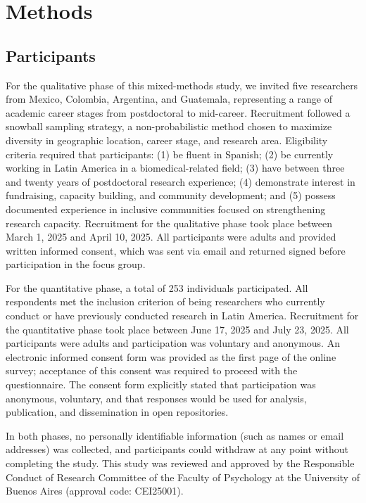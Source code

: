 \documentclass[
  letterpaper,
  DIV=11,
  numbers=noendperiod]{scrartcl}
\begin{document}
\section{Methods}\label{methods}

\subsection{Participants}\label{participants}

For the qualitative phase of this mixed-methods study, we invited five
researchers from Mexico, Colombia, Argentina, and Guatemala,
representing a range of academic career stages from postdoctoral to
mid-career. Recruitment followed a snowball sampling strategy, a
non-probabilistic method chosen to maximize diversity in geographic
location, career stage, and research area. Eligibility criteria required
that participants: (1) be fluent in Spanish; (2) be currently working in
Latin America in a biomedical-related field; (3) have between three and
twenty years of postdoctoral research experience; (4) demonstrate
interest in fundraising, capacity building, and community development;
and (5) possess documented experience in inclusive communities focused
on strengthening research capacity. Recruitment for the qualitative
phase took place between March 1, 2025 and April 10, 2025. All
participants were adults and provided written informed consent, which
was sent via email and returned signed before participation in the focus
group.

For the quantitative phase, a total of 253 individuals participated. All
respondents met the inclusion criterion of being researchers who
currently conduct or have previously conducted research in Latin
America. Recruitment for the quantitative phase took place between June
17, 2025 and July 23, 2025. All participants were adults and
participation was voluntary and anonymous. An electronic informed
consent form was provided as the first page of the online survey;
acceptance of this consent was required to proceed with the
questionnaire. The consent form explicitly stated that participation was
anonymous, voluntary, and that responses would be used for analysis,
publication, and dissemination in open repositories.

In both phases, no personally identifiable information (such as names or
email addresses) was collected, and participants could withdraw at any
point without completing the study. This study was reviewed and approved
by the Responsible Conduct of Research Committee of the Faculty of
Psychology at the University of Buenos Aires (approval code: CEI25001).
\end{document}
